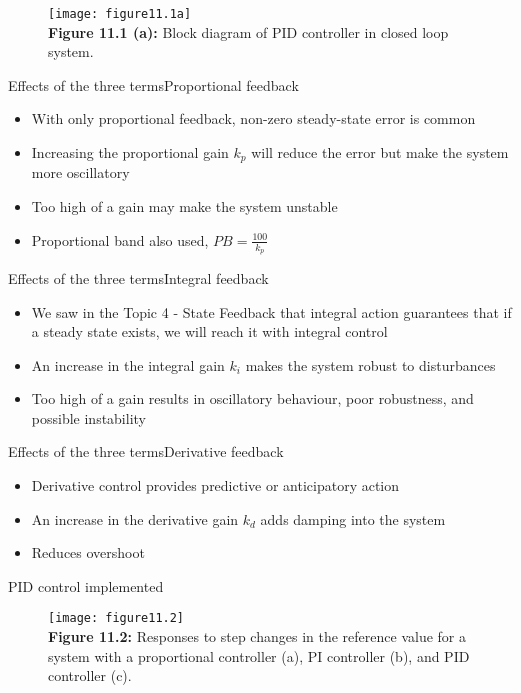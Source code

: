 \documentclass{beamer-control}
\begin{document}
\begin{frame}
\begin{figure}
	\centering
	\texttt{[image: figure11.1a]}
	\\
	\textbf{Figure 11.1 (a):} Block diagram of PID controller in closed loop system. 
\end{figure}
\end{frame}


\begin{frame}{Effects of the three terms}{Proportional feedback}
\begin{itemize}
\item With only proportional feedback, non-zero steady-state error is common
\item Increasing the proportional gain $k_p$ will reduce the error but make the system more oscillatory
\item Too high of a gain may make the system unstable 
\item Proportional band also used, $PB=\tfrac{100}{k_p}$
\end{itemize}
\end{frame}

\begin{frame}{Effects of the three terms}{Integral feedback}
\begin{itemize}
	\item We saw in the Topic 4 - State Feedback that integral action guarantees that if a steady state exists, we will reach it with integral control
	\item An increase in the integral gain $k_i$ makes the system robust to disturbances
	\item Too high of a gain results in oscillatory behaviour, poor robustness, and possible instability
\end{itemize}
\end{frame}


\begin{frame}{Effects of the three terms}{Derivative feedback}
	\begin{itemize}
		\item Derivative control provides predictive or anticipatory action
		\item An increase in the derivative gain $k_d$ adds damping into the system
		\item Reduces overshoot
	\end{itemize}
\end{frame}

\begin{frame}{PID control implemented}
\begin{figure}
	\centering
	\texttt{[image: figure11.2]}
	\\
	\textbf{Figure 11.2:} Responses to step changes in the reference value for a system with a proportional controller (a), PI controller (b), and PID controller (c).
\end{figure}
\end{frame}


\SUMMARYFRAME
\FINALE
\end{document}
